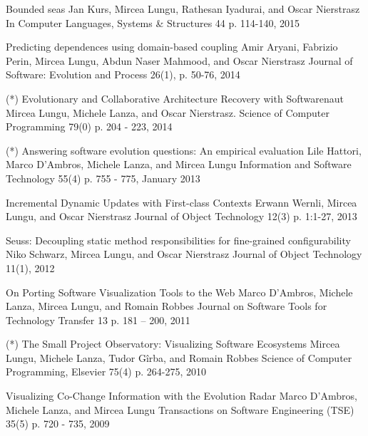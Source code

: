 
\begin{enumerate}

\paper 
	{Bounded seas}
	{Jan Kurs, Mircea Lungu, Rathesan Iyadurai, and Oscar Nierstrasz}
	{In Computer Languages, Systems \& Structures 44 p. 114-140, 2015}

\paper
	{Predicting dependences using domain-based coupling}
	{Amir Aryani, Fabrizio Perin, Mircea Lungu, Abdun Naser Mahmood, and Oscar Nierstrasz}
	{Journal of Software: Evolution and Process 26(1), p. 50-76, 2014}

\paper 
	{(*) Evolutionary and Collaborative Architecture Recovery with Softwarenaut}
	{Mircea Lungu, Michele Lanza, and Oscar Nierstrasz.}
	{Science of Computer Programming 79(0) p. 204 - 223, 2014}

\paper 
	{(*) Answering software evolution questions: An empirical evaluation}
	{Lile Hattori, Marco D'Ambros, Michele Lanza, and Mircea Lungu}
	{Information and Software Technology 55(4) p. 755 - 775, January 2013}

\paper 
	{Incremental Dynamic Updates with First-class Contexts}
	{Erwann Wernli, Mircea Lungu, and Oscar Nierstrasz}
	{Journal of Object Technology 12(3) p. 1:1-27, 2013}

\paper
	{Seuss: Decoupling  static method responsibilities for fine-grained configurability}
	{Niko Schwarz, Mircea Lungu, and Oscar Nierstrasz}
	{Journal of Object Technology 11(1), 2012}

\paper 
	{On Porting Software Visualization Tools to the Web}
	{Marco D'Ambros, Michele Lanza, Mircea Lungu, and Romain Robbes}
	{Journal on Software Tools for Technology Transfer 13 p. 181 -- 200, 2011}

\paper 
	{(*) The Small Project Observatory: Visualizing Software Ecosystems}
	{Mircea Lungu, Michele Lanza, Tudor G\^irba, and Romain Robbes}
	{Science of Computer Programming, Elsevier 75(4) p. 264-275, 2010}

\paper 
	{Visualizing Co-Change Information with the Evolution Radar}
	{Marco D'Ambros, Michele Lanza, and Mircea Lungu}
	{Transactions on Software Engineering (TSE) 35(5) p. 720 - 735, 2009}

\end{enumerate}




